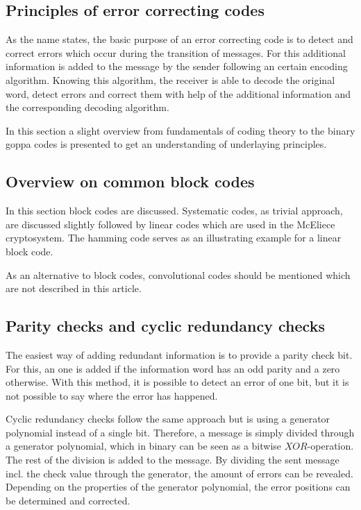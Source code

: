 \subsection*{Principles of error correcting codes}
As the name states, the basic purpose of an error correcting code is to detect and correct errors which occur during the transition of messages. For this additional information is added to the message by the sender following an certain encoding algorithm. Knowing this algorithm, the receiver is able to decode the original word, detect errors and correct them with help of the additional information and the corresponding decoding algorithm. 

In this section a slight overview from fundamentals of coding theory to the binary goppa codes is presented to get an understanding of underlaying principles. 
\subsection*{Overview on common block codes}
In this section block codes are discussed. Systematic codes, as trivial approach, are discussed slightly followed by linear codes which are used in the McEliece cryptosystem. The hamming code serves as an illustrating example for a linear block code. 

As an alternative to block codes, convolutional codes should be mentioned which are not described in this article. 

\subsection*{Parity checks and cyclic redundancy checks}
The easiest way of adding redundant information is to provide a parity check bit. For this, an one is added if the information word has an odd parity and a zero otherwise. With this method, it is possible to detect an error of one bit, but it is not possible to say where the error has happened. 

Cyclic redundancy checks follow the same approach but is using a generator polynomial instead of a single bit. Therefore, a message is simply divided through a generator polynomial, which in binary can be seen as a bitwise $XOR$-operation. The rest of the division is added to the message. By dividing the sent message incl. the check value through the generator, the amount of errors can be revealed. Depending on the properties of the generator polynomial, the error positions can be determined and corrected.\cite{schonfeld2012informations}

